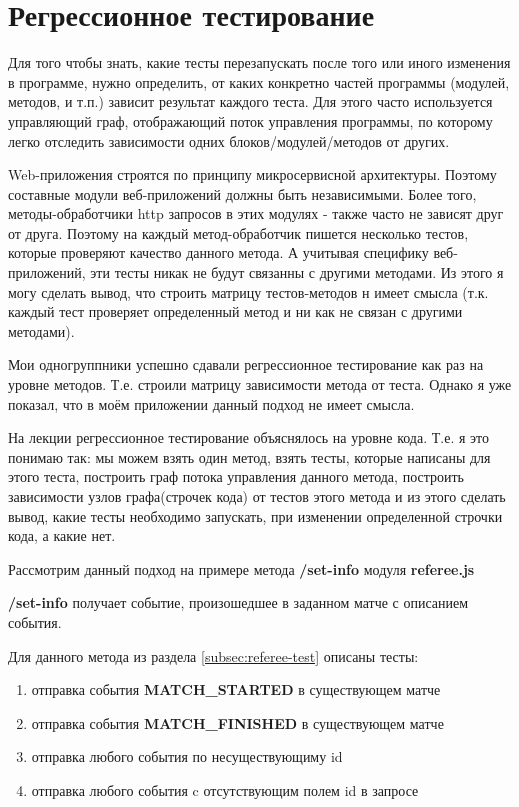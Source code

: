 \section{Регрессионное тестирование}

Для того чтобы знать, какие тесты перезапускать после того или иного изменения в программе, нужно определить, от каких конкретно частей программы (модулей, методов, и т.п.) зависит результат каждого теста. Для этого часто используется ​управляющий граф​, отображающий поток управления программы, по которому легко отследить зависимости одних блоков/модулей/методов от других.

Web-приложения строятся по принципу микросервисной архитектуры. Поэтому составные модули веб-приложений должны быть независимыми. Более того, методы-обработчики http запросов в этих модулях - также часто не зависят друг от друга. Поэтому на каждый метод-обработчик пишется несколько тестов, которые проверяют качество данного метода. А учитывая специфику веб-приложений, эти тесты никак не будут связанны с другими методами. Из этого я могу сделать вывод, что строить матрицу тестов-методов н имеет смысла (т.к. каждый тест проверяет определенный метод и ни как не связан с другими методами).

Мои одногруппники успешно сдавали регрессионное тестирование как раз на уровне методов. Т.е. строили матрицу зависимости метода от теста. Однако я уже показал, что в моём приложении данный подход не имеет смысла. 

На лекции регрессионное тестирование объяснялось на уровне кода. Т.е. я это понимаю так: мы можем взять один метод, взять тесты, которые написаны для этого теста, построить граф потока управления данного метода, построить зависимости узлов графа(строчек кода) от тестов этого метода и из этого сделать вывод, какие тесты необходимо запускать, при изменении определенной строчки кода, а какие нет.

Рассмотрим данный подход на примере метода \textbf{/set-info} модуля \textbf{referee.js}

\textbf{/set-info} получает событие, произошедшее в заданном матче с описанием события.

Для данного метода из раздела \ref{subsec:referee-test} описаны тесты:
\begin{enumerate}
	\item отправка события \textbf{MATCH\_STARTED} в существующем матче
	\item отправка события \textbf{MATCH\_FINISHED} в существующем матче
	\item отправка любого события по несуществующиму id
	\item отправка любого события c отсутствующим полем id в запросе
\end{enumerate}

